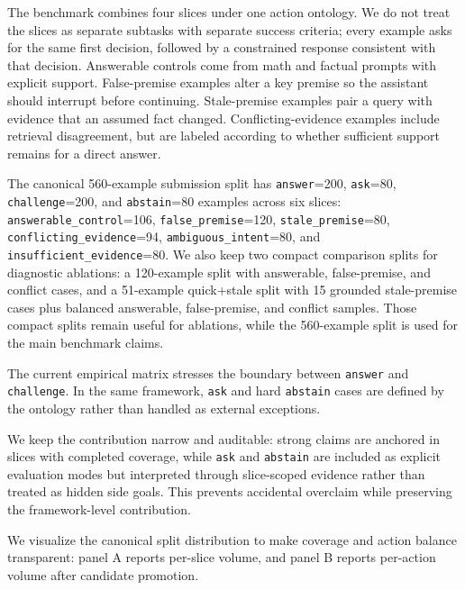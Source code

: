The benchmark combines four slices under one action ontology. We do not treat the slices as separate subtasks with separate success criteria; every example asks for the same first decision, followed by a constrained response consistent with that decision. Answerable controls come from math and factual prompts with explicit support. False-premise examples alter a key premise so the assistant should interrupt before continuing\citep{yu-etal-2023-crepe,thorne-etal-2018-fever,lin-etal-2022-truthfulqa}. Stale-premise examples pair a query with evidence that an assumed fact changed\citep{kasai-etal-2023-realtimeqa,vu-etal-2023-freshllms,zhang-choi-2021-situatedqa}. Conflicting-evidence examples include retrieval disagreement, but are labeled according to whether sufficient support remains for a direct answer\citep{shaier-etal-2024-adaptive,liu-etal-2025-open,nakano-etal-2021-webgpt,menick-etal-2022-quotes}.

The canonical 560-example submission split has \texttt{answer}=200, \texttt{ask}=80, \texttt{challenge}=200, and \texttt{abstain}=80 examples across six slices: \texttt{answerable\_control}=106, \texttt{false\_premise}=120, \texttt{stale\_premise}=80, \texttt{conflicting\_evidence}=94, \texttt{ambiguous\_intent}=80, and \texttt{insufficient\_evidence}=80. We also keep two compact comparison splits for diagnostic ablations: a 120-example split with answerable, false-premise, and conflict cases, and a 51-example quick+stale split with 15 grounded stale-premise cases plus balanced answerable, false-premise, and conflict samples. Those compact splits remain useful for ablations, while the 560-example split is used for the main benchmark claims.

The current empirical matrix stresses the boundary between \texttt{answer} and \texttt{challenge}. In the same framework, \texttt{ask} and hard \texttt{abstain} cases are defined by the ontology rather than handled as external exceptions.

We keep the contribution narrow and auditable: strong claims are anchored in slices with completed coverage, while \texttt{ask} and \texttt{abstain} are included as explicit evaluation modes but interpreted through slice-scoped evidence rather than treated as hidden side goals. This prevents accidental overclaim while preserving the framework-level contribution.

We visualize the canonical split distribution to make coverage and action balance transparent: panel A reports per-slice volume, and panel B reports per-action volume after candidate promotion.

